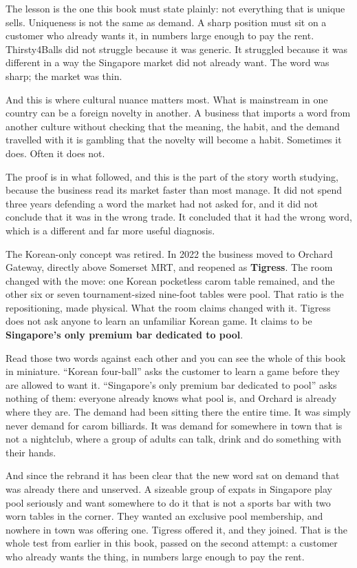 \documentclass[10pt,twoside,openany]{memoir}
\begin{document}
{The lesson is the one this book must state plainly: not everything that
is unique sells. Uniqueness is not the same as demand. A sharp position
must sit on a customer who already wants it, in numbers large enough to
pay the rent. Thirsty4Balls did not struggle because it was generic. It
struggled because it was different in a way the Singapore market did not
already want. The word was sharp; the market was thin.

And this is where cultural nuance matters most. What is mainstream in
one country can be a foreign novelty in another. A business that imports
a word from another culture without checking that the meaning, the
habit, and the demand travelled with it is gambling that the novelty
will become a habit. Sometimes it does. Often it does not.

The proof is in what followed, and this is the part of the story worth
studying, because the business read its market faster than most manage.
It did not spend three years defending a word the market had not asked
for, and it did not conclude that it was in the wrong trade. It
concluded that it had the wrong word, which is a different and far more
useful diagnosis.

The Korean-only concept was retired. In 2022 the business moved to
Orchard Gateway, directly above Somerset MRT, and reopened as
\textbf{Tigress}. The room changed with the move: one Korean pocketless
carom table remained, and the other six or seven tournament-sized
nine-foot tables were pool. That ratio is the repositioning, made
physical. What the room claims changed with it. Tigress does not ask
anyone to learn an unfamiliar Korean game. It claims to be
\textbf{Singapore's only premium bar dedicated to pool}.

Read those two words against each other and you can see the whole of
this book in miniature. ``Korean four-ball'' asks the customer to learn
a game before they are allowed to want it. ``Singapore's only premium
bar dedicated to pool'' asks nothing of them: everyone already knows
what pool is, and Orchard is already where they are. The demand had been
sitting there the entire time. It was simply never demand for carom
billiards. It was demand for somewhere in town that is not a nightclub,
where a group of adults can talk, drink and do something with their
hands.

And since the rebrand it has been clear that the new word sat on demand
that was already there and unserved. A sizeable group of expats in
Singapore play pool seriously and want somewhere to do it that is not a
sports bar with two worn tables in the corner. They wanted an exclusive
pool membership, and nowhere in town was offering one. Tigress offered
it, and they joined. That is the whole test from earlier in this book,
passed on the second attempt: a customer who already wants the thing, in
numbers large enough to pay the rent.

}
\end{document}
